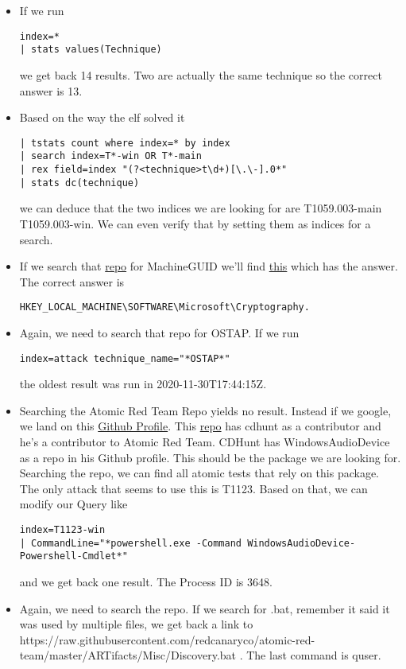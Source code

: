 \begin{itemize}
\item If we run \begin{verbatim}
index=*
| stats values(Technique)
\end{verbatim}
we get back 14 results. Two are actually the same technique so the correct answer is 13.
\item Based on the way the elf solved it
\begin{verbatim}
| tstats count where index=* by index
| search index=T*-win OR T*-main
| rex field=index "(?<technique>t\d+)[\.\-].0*"
| stats dc(technique)
\end{verbatim}
we can deduce that the two indices we are looking for are T1059.003-main T1059.003-win. We can even verify that by setting them as indices for a search.
\item If we search that \href{https://github.com/redcanaryco/atomic-red-team/}{repo} for MachineGUID we'll find \href{https://github.com/redcanaryco/atomic-red-team/blob/7ebf7536b886637d85388c93f34401d493cf4087/atomics/T1082/T1082.md#atomic-test-8---windows-machineguid-discovery}{this} which has the answer.
The correct answer is
\begin{verbatim}
HKEY_LOCAL_MACHINE\SOFTWARE\Microsoft\Cryptography.
\end{verbatim}
\item Again, we need to search that repo for OSTAP. If we run \begin{verbatim}
index=attack technique_name="*OSTAP*"
\end{verbatim}
the oldest result was run in 2020-11-30T17:44:15Z.
\item Searching the Atomic Red Team Repo yields no result. Instead if we google, we land on this \href{https://github.com/frgnca}{Github Profile}. This \href{https://github.com/frgnca/AudioDeviceCmdlets}{repo} has cdhunt as a contributor and he's a contributor to Atomic Red Team. CDHunt has WindowsAudioDevice as a repo in his Github profile. This should be the package we are looking for.
Searching the repo, we can find all atomic tests that rely on this package. The only attack that seems to use this is T1123. Based on that, we can modify our Query like
\begin{verbatim}
index=T1123-win
| CommandLine="*powershell.exe -Command WindowsAudioDevice-Powershell-Cmdlet*"
\end{verbatim}
and we get back one result. The Process ID is 3648.
\item Again, we need to search the repo. If we search for .bat, remember it said it was used  by multiple files, we get back a link to https://raw.githubusercontent.com/redcanaryco/atomic-red-team/master/ARTifacts/Misc/Discovery.bat . The last command is quser.

\end{itemize}
